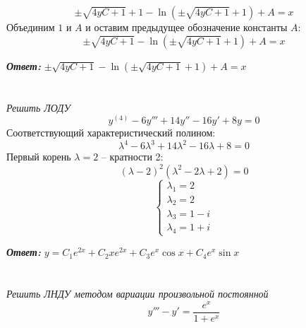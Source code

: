 \documentclass[a5paper, 10pt]{article}
\theoremstyle{definition}
\theoremstyle{plain}
\theoremstyle{remark}
\begin{document}
\begin{equation}
 \pm \sqrt{4yC + 1} + 1 - \ln \left( \pm \sqrt{4yC + 1} + 1 \right) + A = x
\end{equation}
Объединим $1$ и $A$ и оставим предыдущее обозначение константы $A$:
\begin{equation}
 \pm \sqrt{4yC + 1} - \ln \left( \pm \sqrt{4yC + 1} + 1 \right) + A = x
\end{equation}

\textbf{\textit{Ответ:}} $ \pm \sqrt{4yC + 1} - \ln \left( \pm \sqrt{4yC + 1} + 1 \right) + A = x$

\newpage
\section{}
\textit{Решить ЛОДУ}
\\
\begin{equation}
y^{(4)} - 6y'''+14y''-16y'+8y=0
\end{equation}
Соответствующий характеристический полином:
\begin{equation}
\lambda^4 - 6\lambda^3+14\lambda^2-16\lambda+8=0
\end{equation}
Первый корень $\lambda = 2$ -- кратности 2:
\begin{equation}
\left( \lambda - 2 \right)^2 \left( \lambda^2 - 2\lambda + 2 \right) = 0
\end{equation}
\begin{equation}
\begin{cases}
\lambda_1 = 2\\
\lambda_2 = 2\\
\lambda_3 = 1 - i\\
\lambda_4 = 1 + i
\end{cases}
\end{equation}

\textbf{\textit{Ответ:}} $y = C_1e^{2x} + C_2 x e^{2x} + C_3 e^x \cos x + C_4 e^x \sin x $

\newpage
\section{}
\textit{Решить ЛНДУ методом вариации произвольной постоянной}
\\
\begin{equation}
y''' -y' = \frac{e^x}{1+e^x}
\end{equation}
\end{document}

